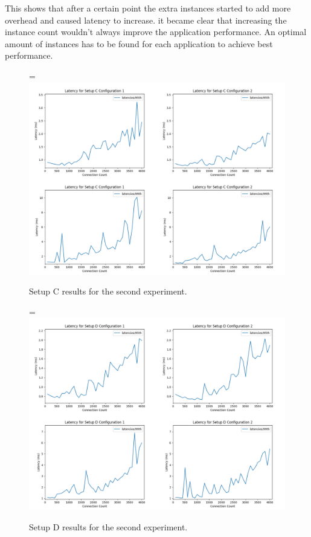 \documentclass[12pt,oneandhalf,chaparabic,ceng,ms,eng,oneside,pntc]{gsufbe}
\makeatletter
\let\old@includegraphics\includegraphics
\renewcommand{\includegraphics}[2][,]{%
  \setbox9=\hbox{\old@includegraphics[#1]{#2}}%
  \ifdim\wd9>\textwidth
    \old@includegraphics[#1,width=\textwidth]{#2}%
  \else
    \old@includegraphics[#1]{#2}%
  \fi%
}
\makeatother
\begin{document}
This shows that after a certain point the extra instances started to add more overhead and caused 
latency to increase. it became clear that increasing the instance count wouldn't always improve
the application performance. An optimal amount of instances has to be found for each application
to achieve best performance.

\begin{figure}
\centering
\includegraphics[]{setupc.png}
\caption{Setup C results for the second experiment.}
\label{fig:setupc}
\end{figure}

\begin{figure}
\centering
\includegraphics[]{setupd.png}
\caption{Setup D results for the second experiment.}
\label{fig:setupd}
\end{figure}
\end{document}
